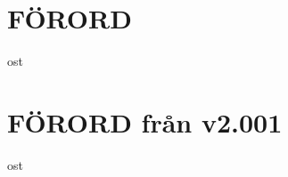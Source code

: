 \documentclass[a6paper,fontsize=10pt,twoside,openright]{scrbook}
\begin{document}
\section{FÖRORD}\vspace{10pt}
\hspace{\indent} ost
\cleardoublepage
\section{FÖRORD från v2.001}\vspace{10pt}
\hspace{\indent} ost
\cleardoublepage
\end{document}
